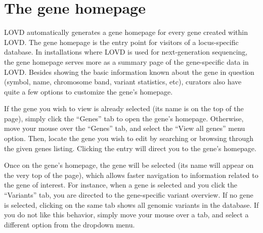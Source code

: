 \documentclass[a4paper,oneside,openany,12pt]{memoir}
\renewenvironment{leftbar}[1][\hsize]
{%
    \def\FrameCommand
    {%
        {\color{LOVDdark}\vrule width 3pt \hspace{5pt}}%
        \colorbox{LOVDlight}%
    }%
    \MakeFramed{\hsize#1\advance\hsize-\width\FrameRestore}%
}
{\endMakeFramed}
\begin{document}
\section{The gene homepage}
LOVD automatically generates a gene homepage for every gene created within LOVD.
The gene homepage is the entry point for visitors of a locus-specific database.
In installations where LOVD is used for next-generation sequencing, the gene homepage serves more as a summary page of the gene-specific data in LOVD.
Besides showing the basic information known about the gene in question (symbol, name, chromosome band, variant statistics, etc), curators also have quite a few options to customize the gene's homepage.
\\
\par
If the gene you wish to view is already selected (its name is on the top of the page), simply click the ``Genes'' tab to open the gene's homepage.
Otherwise, move your mouse over the ``Genes'' tab, and select the ``View all genes'' menu option.
Then, locate the gene you wish to edit by searching or browsing through the given genes listing.
Clicking the entry will direct you to the gene's homepage.
\par
Once on the gene's homepage, the gene will be selected (its name will appear on the very top of the page), which allows faster navigation to information related to the gene of interest.
For instance, when a gene is selected and you click the ``Variants'' tab, you are directed to the gene-specific variant overview.
If no gene is selected, clicking on the same tab shows all genomic variants in the database.
If you do not like this behavior, simply move your mouse over a tab, and select a different option from the dropdown menu.
\end{document}
